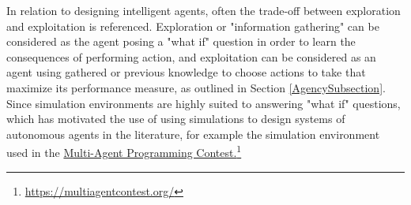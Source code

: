 
 In relation to designing intelligent agents, often the trade-off between exploration and exploitation is referenced. Exploration or "information gathering" \cite{AIAMA} can be considered as the agent posing a "what if" question in order to learn the consequences of performing action, and exploitation can be considered as an agent using gathered or previous knowledge to choose actions to take that maximize its performance measure, as outlined in Section \ref{AgencySubsection}. Since simulation environments are highly suited to answering "what if" questions, which has motivated the use of using simulations to design systems of autonomous agents in the literature, for example the simulation environment used in the 
\href{https://multiagentcontest.org/}{Multi-Agent Programming Contest.}\footnote{\href {https://multiagentcontest.org/}{https://multiagentcontest.org/}}



